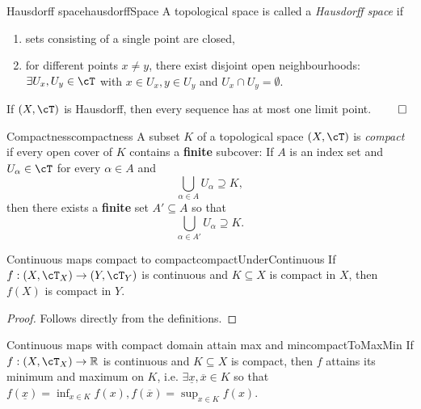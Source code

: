 \documentclass[language=english]{../../Template/TemplateLecture}
\begin{document}
\begin{defi}{Hausdorff space}{hausdorffSpace}
    A topological space is called a \emph{Hausdorff space} if 
    \begin{enumerate}[$(i)$]
        \item sets consisting of a single point are closed,
        \item for different points $x \neq y$, there exist disjoint open neighbourhoods: $\exists U_x, U_y \in \cT$ with $x \in U_x, y \in U_y$ and $U_x \cap U_y = \emptyset$.
    \end{enumerate}
\end{defi}

\begin{prop}
    If $(X, \cT)$ is Hausdorff, then every sequence has at most one limit point. \hfill $\qed$
\end{prop}

\begin{defi}{Compactness}{compactness}
    A subset $K$ of a topological space $(X, \cT)$ is \emph{compact} if every open cover of $K$ contains a \textbf{finite} subcover: If $A$ is an index set and $U_\alpha \in \cT$ for every $\alpha \in A$ and 
    \begin{equation}
        \bigcup_{\alpha \in A} U_\alpha \supseteq K,
    \end{equation}
    then there exists a \textbf{finite} set $A' \subseteq A$ so that 
    \begin{equation}
        \bigcup_{\alpha \in A'} U_\alpha \supseteq K.
    \end{equation}
\end{defi}

\begin{lem}{Continuous maps compact to compact}{compactUnderContinuous}
    If $f: (X, \cT_X) \to (Y, \cT_Y)$ is continuous and $K \subseteq X$ is compact in $X$, then $f(X)$ is compact in $Y$.
\end{lem}

\begin{proof}
    Follows directly from the definitions.
\end{proof}

\begin{thm}{Continuous maps with compact domain attain max and min}{compactToMaxMin}
    If $f: (X, \cT_X) \to \IR$ is continuous and $K \subseteq X$ is compact, then $f$ attains its minimum and maximum on $K$, i.e. $\exists \underline{x}, \overline{x} \in K$ so that $f(\underline{x}) = \inf_{x \in K} f(x), f(\overline{x}) = \sup_{x \in K} f(x)$.
\end{thm}
\end{document}
